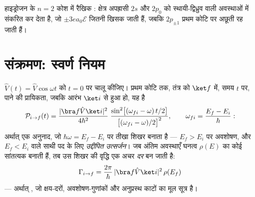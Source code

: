 \begin{omfigure}

{\small हाइड्रोजन के $n = 2$ कोश में रैखिक :
क्षेत्र अपह्रासी $2s$ और $2p_0$ को स्थायी-द्विध्रुव वाली अवस्थाओं में
संकरित कर देता है, जो $\pm3ea_0\mathcal E$ जितनी खिसक जाती हैं, जबकि
$2p_{\pm1}$ प्रथम कोटि पर अछूती रह जाती हैं।}
\end{omfigure}

\section{संक्रमण: स्वर्ण नियम}

\begin{theorem}[काल-निर्भर विक्षोभ]\label{thm:b3:perturbation-theory:golden}
$\hat V(t) = \hat V\cos\omega t$ को $t = 0$ पर चालू कीजिए। प्रथम
कोटि तक, तंत्र को $\ket f$ में, समय $t$ पर, पाने की प्रायिकता, जबकि
आरंभ $\ket i$ से हुआ हो, यह है
\[
\mathcal P_{i\to f}(t) = \frac{|\bra f\hat V\ket i|^2}{4\hbar^2}\;
\frac{\sin^2\!\big[(\omega_{fi} - \omega)\,t/2\big]}
{\big[(\omega_{fi} - \omega)/2\big]^2} ,
\qquad \omega_{fi} = \frac{E_f - E_i}{\hbar} :
\]
अर्थात् एक अनुनाद, जो $\hbar\omega = E_f - E_i$ पर तीखा शिखर बनाता है
--- $E_f > E_i$ पर अवशोषण, और $E_f < E_i$ वाले साथी पद के लिए
\emph{उद्दीपित उत्सर्जन}। जब अंतिम अवस्थाएँ घनत्व $\rho(E)$ का कोई
सांतत्यक बनाती हैं, तब उस शिखर की वृद्धि एक अचर
\emph{दर} बन जाती है:
\[
\Gamma_{i\to f} = \frac{2\pi}{\hbar}\,
|\bra f\hat V\ket i|^2\,\rho(E_f)
\]
--- अर्थात् \emph{}, जो क्षय-दरों,
अवशोषण-गुणांकों और अनुप्रस्थ काटों का मूल सूत्र है।
\end{theorem}

